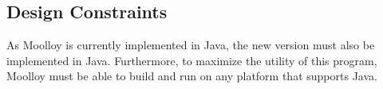 \documentclass[11pt]{article}
\theoremstyle{definition}
\begin{document}
\subsection{Design Constraints}\label{sec:constraints}

As Moolloy is currently implemented in Java, the new version must also
be implemented in Java. Furthermore, to maximize the utility of this
program, Moolloy must be able to build and run on any platform that
supports Java.



\printbibliography
\end{document}
